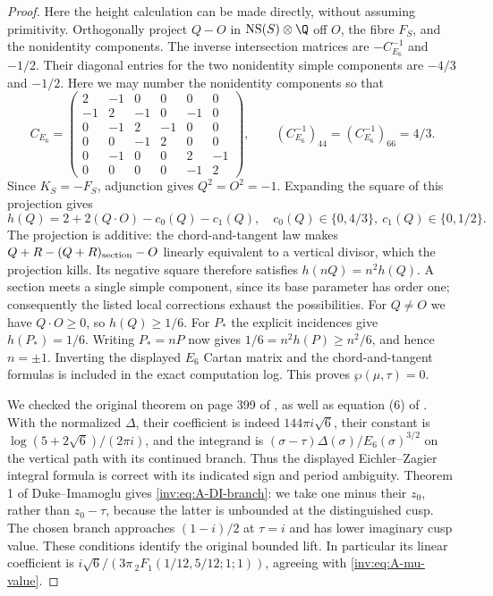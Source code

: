 \begin{proof}
Here the height calculation can be made directly, without assuming
primitivity.  Orthogonally project $Q-O$ in
$\operatorname{NS}(S)\otimes\Q$ off $O$, the fibre $F_S$, and the
nonidentity components.  The inverse intersection matrices are
$-C_{E_6}^{-1}$ and $-1/2$.  Their diagonal entries for the two
nonidentity simple components are $-4/3$ and $-1/2$.
Here we may number the nonidentity components so that
\[
C_{E_6}=\begin{pmatrix}
2&-1&0&0&0&0\\
-1&2&-1&0&-1&0\\
0&-1&2&-1&0&0\\
0&0&-1&2&0&0\\
0&-1&0&0&2&-1\\
0&0&0&0&-1&2
\end{pmatrix},\qquad
(C_{E_6}^{-1})_{44}=(C_{E_6}^{-1})_{66}=4/3.
\]
Since $K_S=-F_S$, adjunction gives $Q^2=O^2=-1$.  Expanding the
square of this projection gives
\[
h(Q)=2+2(Q\cdot O)-c_0(Q)-c_1(Q),\quad
c_0(Q)\in\{0,4/3\},\ c_1(Q)\in\{0,1/2\}.
\]
The projection is additive: the chord-and-tangent law makes
$Q+R-(Q+R)_{\rm section}-O$ linearly equivalent to a vertical
divisor, which the projection kills.  Its negative square therefore
satisfies $h(nQ)=n^2h(Q)$.  A section meets a single simple
component, since its base parameter has order one; consequently
the listed local corrections exhaust the possibilities.
For $Q\ne O$ we have $Q\cdot O\ge0$, so $h(Q)\ge1/6$.
For $P_*$ the explicit incidences give $h(P_*)=1/6$.
Writing $P_*=nP$ now gives $1/6=n^2h(P)\ge n^2/6$, and hence
$n=\pm1$.  Inverting the displayed $E_6$ Cartan matrix and the
chord-and-tangent formulas is included in the exact computation log.
This proves $\wp(\mu,\tau)=0$.

We checked the original theorem on page 399 of
\citet{EichlerZagier1982}, as well as equation (6) of
\citet{DukeImamoglu2008}.  With the normalized $\Delta$, their
coefficient is indeed $144\pi i\sqrt6$, their constant is
$\log(5+2\sqrt6)/(2\pi i)$, and the integrand is
$(\sigma-\tau)\Delta(\sigma)/E_6(\sigma)^{3/2}$ on the vertical
path with its continued branch.  Thus the displayed Eichler--Zagier integral formula is
correct with its indicated sign and period ambiguity.  Theorem 1
of Duke--Imamoglu gives \eqref{inv:eq:A-DI-branch}: we take one minus
their $z_0$, rather than $z_0-\tau$, because the latter is unbounded
at the distinguished cusp.  The chosen branch approaches
$(1-i)/2$ at $\tau=i$ and has lower imaginary cusp value.
These conditions identify the original bounded lift.  In particular
its linear coefficient is
$i\sqrt6/(3\pi\,{}_2F_1(1/12,5/12;1;1))$, agreeing with
\eqref{inv:eq:A-mu-value}.


\end{proof}

